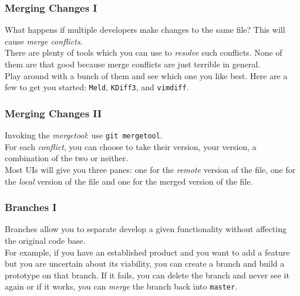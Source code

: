\documentclass{lug}
\begin{document}
\begin{frame}
    \frametitle{Merging Changes I}

    What happens if multiple developers make changes to the same file? This will cause \textit{merge
    conflicts}.\\

    There are plenty of tools which you can use to \textit{resolve} such conflicts. None of them are
    that good because merge conflicts are just terrible in general.\\

    Play around with a bunch of them and see which one you like best. Here are a few to get you
    started: \texttt{Meld}, \texttt{KDiff3}, and \texttt{vimdiff}.\\
\end{frame}

\begin{frame}
    \frametitle{Merging Changes II}

    Invoking the \textit{mergetool}: use \texttt{git mergetool}.\\

    For each \textit{conflict}, you can choose to take their version, your version, a combination of
    the two or neither.\\

    Most UIs will give you three panes: one for the \textit{remote} version of the file, one for the
    \textit{local} version of the file and one for the merged version of the file.

\end{frame}

\begin{frame}
    \frametitle{Branches I}

    Branches allow you to separate develop a given functionality without affecting the original code
    base.\\

    For example, if you have an established product and you want to add a feature but you are
    uncertain about its viability, you can create a branch and build a prototype on that branch. If
    it fails, you can delete the branch and never see it again or if it works, you can
    \textit{merge} the branch back into \texttt{master}.
\end{frame}
\end{document}
